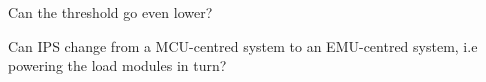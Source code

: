 Can the threshold go even lower?

Can IPS change from a MCU-centred system to an EMU-centred system, i.e powering the load modules in turn?






